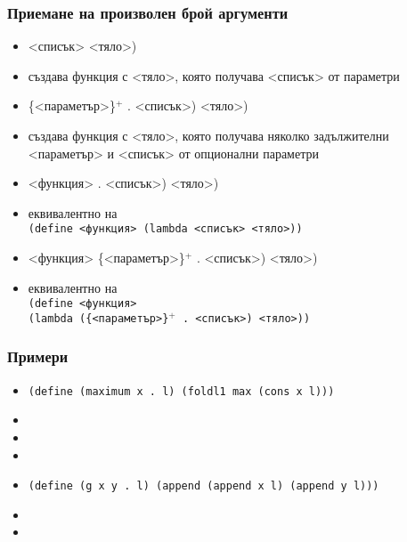 \documentclass{beamer}
\begin{document}
\begin{frame}
  \frametitle{Приемане на произволен брой аргументи}

  \begin{itemize}[<+->]
  \item {}<списък> <тяло>\tta)
  \item създава функция с <тяло>, която получава <списък> от параметри
  \item {}\{<параметър>\}$^+$ \tta. <списък>\tta) <тяло>\tta)
  \item създава функция с <тяло>, която получава няколко задължителни <параметър> и <списък> от опционални параметри
  \item {}<функция> \tta. <списък>\tta) <тяло>\tta)
  \item еквивалентно на \\
    \tt{(define }<функция> \tt{(lambda }<списък> <тяло>\tt{))}
  \item {}<функция> \{<параметър>\}$^+$ \tta. <списък>\tta) <тяло>\tta)
  \item еквивалентно на \\
    \tt{(define }<функция>\\
    \hspace{10ex}\tt{(lambda (}\{<параметър>\}$^+$ \tt. <списък>\tt) <тяло>\tt{))}
  \end{itemize}
\end{frame}

\begin{frame}
  \frametitle{Примери}

  \begin{itemize}[<+->]
  \item \tt{(define (maximum x . l) (foldl1 max (cons x l)))}
  \item {}
  \item {}
  \item {}
  \item \tt{(define (g x y . l) (append (append x l) (append y l)))}
  \item {}
  \item {}
  \end{itemize}
\end{frame}
\end{document}
